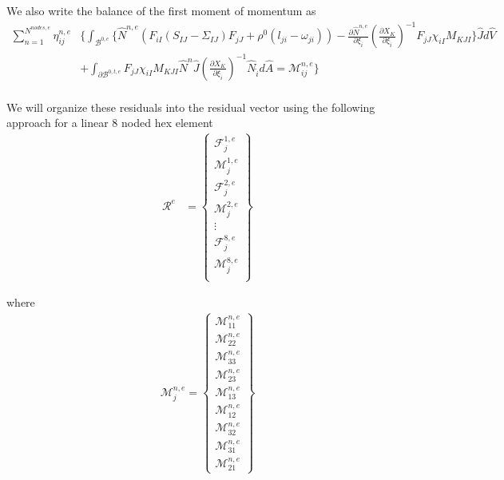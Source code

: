 We also write the balance of the first moment of momentum as
\begin{align*}
\sum_{n=1}^{N^{nodes,e}} \eta_{ij}^{n,e} &\bigg\{\int_{\mathcal{B}^{0,e}}  \bigg\{\hat{N}^{n,e} \left(F_{iI} \left(S_{IJ}-\Sigma_{IJ}\right) F_{jJ} + \rho^0\left(l_{ji} - \omega_{ji} \right)\right)  - \frac{\partial \hat{N}^{n,e}}{\partial \xi_{\hat{i}}} \left(\frac{\partial X_{K}}{\partial \xi_{\hat{i}}}\right)^{-1} F_{jJ} \chi_{iI}  M_{KJI} \bigg\} \hat{J} d\hat{V}\\
& + \int_{\partial \mathcal{B}^{0,t,e}} F_{jJ} \chi_{iI}  M_{KJI} \hat{N}^n \hat{J} \left(\frac{\partial X_{K}}{\partial \xi_{\hat{i}}}\right)^{-1} \hat{N}_{\hat{i}} d\hat{A} = \mathcal{M}_{ij}^{n,e} \bigg\}\\
\end{align*}

We will organize these residuals into the residual vector using the following approach for a linear 8 noded hex element
\begin{align*}
\mathcal{R}^e &= \left\{\begin{array}{c}
\mathcal{F}_j^{1,e}\\
\mathcal{M}_j^{1,e}\\
\mathcal{F}_j^{2,e}\\
\mathcal{M}_j^{2,e}\\
\vdots\\
\mathcal{F}_j^{8,e}\\
\mathcal{M}_j^{8,e}\\
\end{array}\right\}
\end{align*}

where
\begin{align*}
\mathcal{M}_j^{n,e} = \left\{\begin{array}{c}
\mathcal{M}_{11}^{n,e}\\
\mathcal{M}_{22}^{n,e}\\
\mathcal{M}_{33}^{n,e}\\
\mathcal{M}_{23}^{n,e}\\
\mathcal{M}_{13}^{n,e}\\
\mathcal{M}_{12}^{n,e}\\
\mathcal{M}_{32}^{n,e}\\
\mathcal{M}_{31}^{n,e}\\
\mathcal{M}_{21}^{n,e}
\end{array}\right\}
\end{align*}

